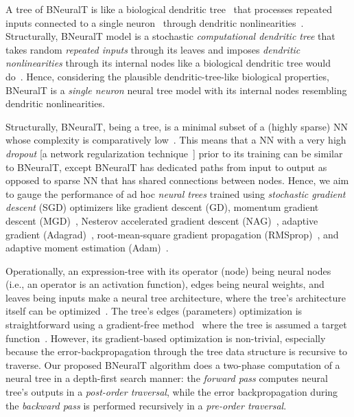 \documentclass[11pt,a4paper]{article}
\begin{document}
   	A tree of BNeuralT is like a biological dendritic tree~\citep{travis2005regional,mel2016toward} that processes repeated inputs connected to a single neuron~\citep{beniaguev2020single,jones2021might}  through dendritic nonlinearities~\citep{london2005dendritic}.  
Structurally, BNeuralT model is a stochastic \textit{computational dendritic tree} that takes random \textit{repeated inputs} through its leaves and imposes \textit{dendritic nonlinearities} through its internal nodes like a biological dendritic tree would do~\citep{travis2005regional,jones2021might}. 
Hence, considering the plausible dendritic-tree-like  biological properties, BNeuralT is a \textit{single neuron} neural tree model with its internal nodes resembling  dendritic nonlinearities.


    Structurally, BNeuralT, being a tree, is a minimal subset of a  (highly sparse) NN whose complexity is comparatively low~\citep{poirazi2003pyramidal}. This means that a NN with a very high \textit{dropout} [a network regularization technique~\citep{srivastava14aJMLR}] prior to its training can be similar to BNeuralT, except BNeuralT has dedicated paths from input to output as opposed to sparse NN that has shared connections between nodes. Hence, we aim to gauge the performance of ad hoc \textit{neural trees} trained using \textit{stochastic gradient descent} (SGD) optimizers like gradient descent (GD), momentum gradient descent (MGD)~\citep{qian1999momentum}, Nesterov accelerated gradient descent (NAG)~\citep{bengio2013advances}, adaptive gradient (Adagrad)~\citep{dean2012large}, root-mean-square gradient propagation (RMSprop)~\citep{tieleman2012lecture}, and adaptive moment estimation (Adam)~\citep{diederik2015adam}. 
    
    Operationally, an expression-tree with its operator (node) being neural nodes (i.e., an operator is an activation function),  edges being neural weights, and leaves being inputs make a neural tree architecture, where the tree's architecture itself can be optimized~\citep{chen2005time,schmidt2009solving}. The tree's edges (parameters) optimization is straightforward using a gradient-free method~\citep{rios2013derivative,kennedy1995particle} where the tree is assumed a target function~\citep{ojha2017ensemble}. However, its gradient-based optimization is non-trivial, especially because the error-backpropagation through the tree data structure is recursive to traverse. Our proposed BNeuralT algorithm does a two-phase computation of a neural tree in  a depth-first search manner: the \textit{forward pass} computes neural tree's outputs in a \textit{post-order traversal}, while the error  backpropagation during the \textit{backward pass} is performed recursively in a \textit{pre-order traversal}. 
    
\end{document}
